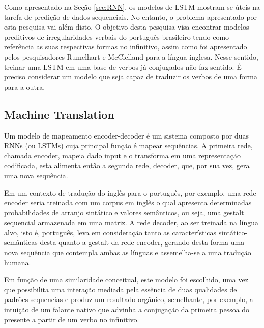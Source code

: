 Como apresentado na Seção \ref{sec:RNN}, os modelos de LSTM mostram-se úteis na tarefa de predição de dados sequenciais. No entanto, o problema apresentado por esta pesquisa vai além disto. O objetivo desta pesquisa visa encontrar modelos preditivos de irregularidades verbais do português brasileiro tendo como referência as suas respectivas formas no infinitivo, assim como foi apresentado pelos pesquisadores Rumelhart e McClelland para a língua inglesa. Nesse sentido, treinar uma LSTM em uma base de verbos já conjugados não faz sentido. É preciso considerar um modelo que seja capaz de traduzir os verbos de uma forma para a outra. 

\subsection{Machine Translation}

Um modelo de mapeamento encoder-decoder é um sistema composto por duas RNNs (ou LSTMs) cuja principal função é mapear sequências. A primeira rede, chamada encoder, mapeia dado input e o transforma em uma representação codificada, esta alimenta então a segunda rede, decoder, que, por sua vez, gera uma nova sequência. 

Em um contexto de tradução do inglês para o português, por exemplo, uma rede encoder seria treinada com um corpus em inglês o qual apresenta determinadas probabilidades de arranjo sintático e valores semânticos, ou seja, uma gestalt sequencial armazenada em uma matriz. A rede decoder, ao ser treinada na língua alvo, isto é, português, leva em consideração tanto as características sintático-semânticas desta quanto a gestalt da rede encoder, gerando desta forma uma nova sequência que contempla ambas as línguas e assemelha-se a uma tradução humana.

Em função de uma similaridade conceitual, este modelo foi escolhido, uma vez que possibilita uma interação mediada pela essência de duas qualidades de padrões sequencias e produz um resultado orgânico, semelhante, por exemplo, a intuição de um falante nativo que advinha a conjugação da primeira pessoa do presente a partir de um verbo no infinitivo. 




